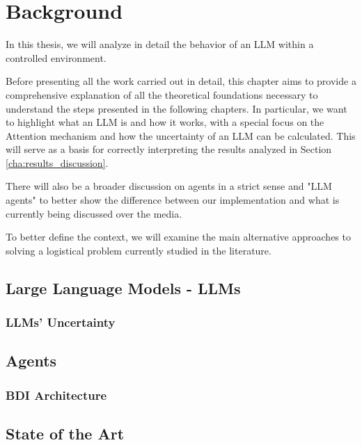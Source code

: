 \chapter{Background}
\label{cha:background}

In this thesis, we will analyze in detail the behavior of an LLM within a controlled
environment.

Before presenting all the work carried out in detail, this chapter aims to
provide a comprehensive explanation of all the theoretical foundations necessary
to understand the steps presented in the following chapters. In particular, we
want to highlight what an LLM is and how it works, with a special focus on the Attention
mechanism and how the uncertainty of an LLM can be calculated. This will serve
as a basis for correctly interpreting the results analyzed in Section
\ref{cha:results_discussion}.

There will also be a broader discussion on agents in a strict sense and "LLM agents"
to better show the difference between our implementation and what is currently
being discussed over the media.

To better define the context, we will examine the main alternative approaches to
solving a logistical problem currently studied in the literature.

\section{Large Language Models - LLMs}
\label{sec:large_language_models_llms}
\subsection{LLMs' Uncertainty}
\label{sub:llms_uncertainty}

\section{Agents}
\label{sec:agents}
\subsection{BDI Architecture}
\label{sub:bdi_architecture}
\section{State of the Art}
\label{sec:state_of_the_art}